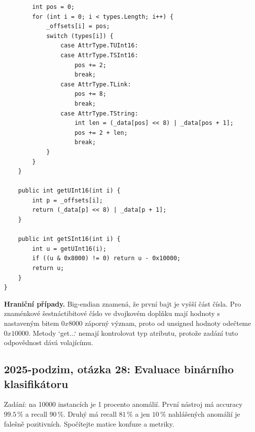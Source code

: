 \begin{odpoved}
\begin{verbatim}
        int pos = 0;
        for (int i = 0; i < types.Length; i++) {
            _offsets[i] = pos;
            switch (types[i]) {
                case AttrType.TUInt16:
                case AttrType.TSInt16:
                    pos += 2;
                    break;
                case AttrType.TLink:
                    pos += 8;
                    break;
                case AttrType.TString:
                    int len = (_data[pos] << 8) | _data[pos + 1];
                    pos += 2 + len;
                    break;
            }
        }
    }

    public int getUInt16(int i) {
        int p = _offsets[i];
        return (_data[p] << 8) | _data[p + 1];
    }

    public int getSInt16(int i) {
        int u = getUInt16(i);
        if ((u & 0x8000) != 0) return u - 0x10000;
        return u;
    }
}
\end{verbatim}

\textbf{Hraniční případy.} Big-endian znamená, že první bajt je vyšší část čísla. Pro
znaménkové šestnáctibitové číslo ve dvojkovém doplňku mají hodnoty s nastaveným bitem
$0x8000$ záporný význam, proto od unsigned hodnoty odečteme $0x10000$. Metody `get...`
nemají kontrolovat typ atributu, protože zadání tuto odpovědnost dává volajícímu.
\end{odpoved}

\subsection{2025-podzim, otázka 28: Evaluace binárního klasifikátoru}

Zadání: na 10000 instancích je 1 procento anomálií. První nástroj má accuracy $99.5\,\%$
a recall $90\,\%$. Druhý má recall $81\,\%$ a jen $10\,\%$ nahlášených anomálií je falešně
pozitivních. Spočítejte matice konfuze a metriky.

